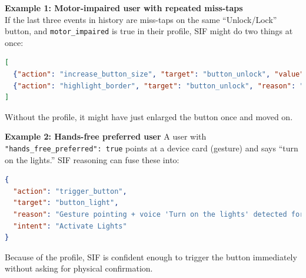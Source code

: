\documentclass[openany]{book}
\begin{document}
\textbf{Example 1: Motor-impaired user with repeated miss-taps}\\
If the last three events in history are miss-taps on the same “Unlock/Lock” button, and \texttt{motor\_impaired} is true in their profile, SIF might do two things at once:
\begin{lstlisting}[language=json, caption={Possible motor-impaired user adaptations}]
[
  {"action": "increase_button_size", "target": "button_unlock", "value": 1.5, "reason": "Multiple miss-taps detected, enlarging button for better accessibility"},
  {"action": "highlight_border", "target": "button_unlock", "reason": "Increase button visibility for the user"}
]
\end{lstlisting}
Without the profile, it might have just enlarged the button once and moved on.

\textbf{Example 2: Hands-free preferred user}
A user with \texttt{"hands\_free\_preferred": true} points at a device card (gesture) and says “turn on the lights.”
SIF reasoning can fuse these into:
\begin{lstlisting}[language=json, caption={Hands-free user intent fusion}]
{
  "action": "trigger_button",
  "target": "button_light",
  "reason": "Gesture pointing + voice 'Turn on the lights' detected for hands-free user",
  "intent": "Activate Lights"
}
\end{lstlisting}
Because of the profile, SIF is confident enough to trigger the button immediately without asking for physical confirmation.
\end{document}
